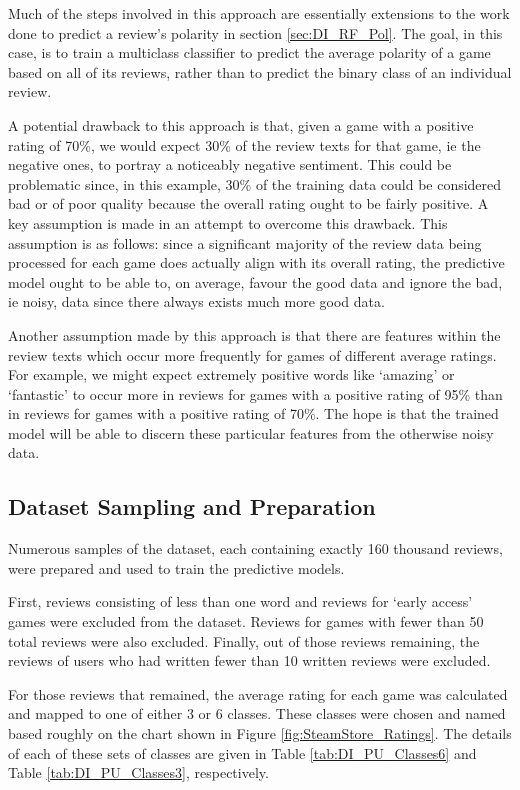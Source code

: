 Much of the steps involved in this approach are essentially extensions to the work done to predict a review's polarity in section \ref{sec:DI_RF_Pol}. The goal, in this case, is to train a multiclass classifier to predict the average polarity of a game based on all of its reviews, rather than to predict the binary class of an individual review.

A potential drawback to this approach is that, given a game with a positive rating of 70\%, we would expect 30\% of the review texts for that game, ie the negative ones, to portray a noticeably negative sentiment. This could be problematic since, in this example, 30\% of the training data could be considered bad or of poor quality because the overall rating ought to be fairly positive. A key assumption is made in an attempt to overcome this drawback. This assumption is as follows: since a significant majority of the review data being processed for each game does actually align with its overall rating, the predictive model ought to be able to, on average, favour the good data and ignore the bad, ie noisy, data since there always exists much more good data.

Another assumption made by this approach is that there are features within the review texts which occur more frequently for games of different average ratings. For example, we might expect extremely positive words like `amazing' or `fantastic' to occur more in reviews for games with a positive rating of 95\% than in reviews for games with a positive rating of 70\%. The hope is that the trained model will be able to discern these particular features from the otherwise noisy data.

\subsection{Dataset Sampling and Preparation}

Numerous samples of the dataset, each containing exactly 160 thousand reviews, were prepared and used to train the predictive models.

First, reviews consisting of less than one word and reviews for `early access' games were excluded from the dataset. Reviews for games with fewer than 50 total reviews were also excluded. Finally, out of those reviews remaining, the reviews of users who had written fewer than 10 written reviews were excluded.

For those reviews that remained, the average rating for each game was calculated and mapped to one of either 3 or 6 classes. These classes were chosen and named based roughly on the chart shown in Figure \ref{fig:SteamStore_Ratings}. The details of each of these sets of classes are given in Table \ref{tab:DI_PU_Classes6} and Table \ref{tab:DI_PU_Classes3}, respectively.

